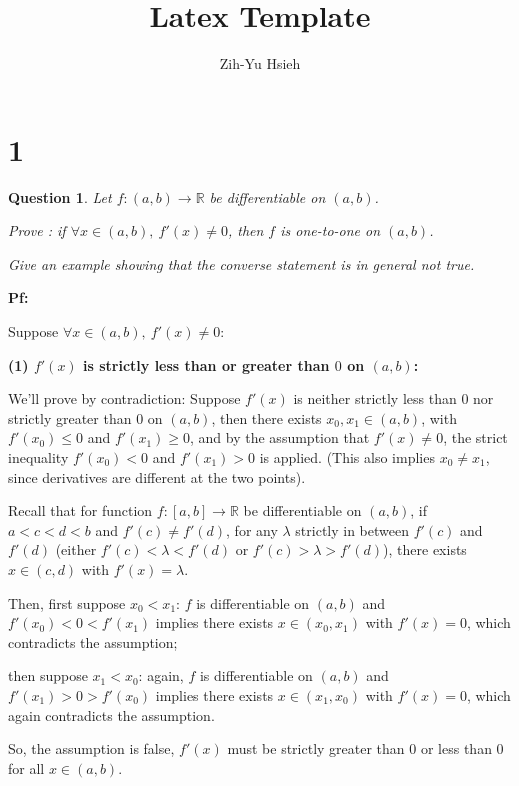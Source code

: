\documentclass{article}
\title{Latex Template}
\author{Zih-Yu Hsieh}
\newtheorem{question}{Question}
\begin{document}
\maketitle

\section*{1}
\begin{question}
    Let $f : (a, b) \rightarrow \mathbb{R}$ be differentiable on $(a, b)$.
    
    Prove : if $\forall x\in(a,b),\ f'(x)\neq 0$, then $f$ is one-to-one on $(a, b)$.
    
    Give an example showing that the converse statement is in general not true.
\end{question}

\textbf{Pf:}

Suppose $\forall x\in(a,b),\ f'(x)\neq 0$:

\hfill

\textbf{(1) $f'(x)$ is strictly less than or greater than $0$ on $(a,b)$:}

We'll prove by contradiction: Suppose $f'(x)$ is neither strictly less than $0$ nor strictly greater than $0$ on $(a,b)$,
then there exists $x_0, x_1\in (a,b)$, with $f'(x_0)\leq 0$ and $f'(x_1)\geq 0$, and by the assumption that $f'(x)\neq 0$,
the strict inequality $f'(x_0)< 0$ and $f'(x_1)> 0$ is applied. (This also implies $x_0 \neq x_1$, since derivatives are different
 at the two points).

\hfill

Recall that for function $f:[a,b]\rightarrow \mathbb{R}$ be differentiable on $(a,b)$, if $a<c<d<b$ and 
$f'(c)\neq f'(d)$, for any $\lambda$ strictly in between $f'(c)$ and $f'(d)$ (either $f'(c)<\lambda<f'(d)$ or $f'(c)>\lambda>f'(d)$),
there exists $x\in (c,d)$ with $f'(x)=\lambda$.

Then, first suppose $x_0<x_1$: $f$ is differentiable on $(a,b)$ and $f'(x_0) < 0 < f'(x_1)$ implies there exists $x\in(x_0,x_1)$ with
$f'(x)=0$, which contradicts the assumption;

then suppose $x_1<x_0$: again, $f$ is differentiable on $(a,b)$ and $f'(x_1)>0>f'(x_0)$ implies there exists $x\in (x_1,x_0)$ with
$f'(x)=0$, which again contradicts the assumption.

So, the assumption is false, $f'(x)$ must be strictly greater than $0$ or less than $0$ for all $x\in (a,b)$.

\hfill
\end{document}

